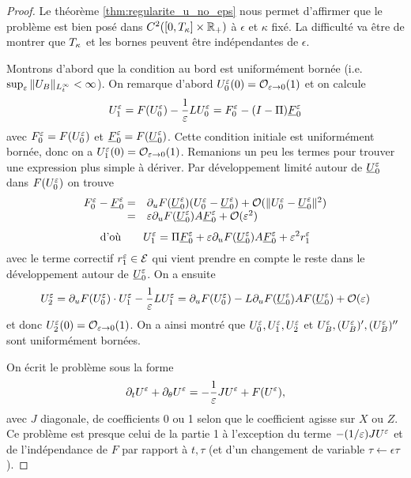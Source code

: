 \begin{proof}
\newcommand{\ulF}{\underline{F}}
Le théorème \ref{thm:regularite_u_no_eps} nous permet d'affirmer que le problème est bien posé dans $C^2([0,T_{\kappa}]\times\mathbb{R}_+)$ à $\epsilon$ et $\kappa$ fixé. La difficulté va être de montrer que $T_{\kappa}$ et les bornes peuvent être indépendantes de $\epsilon$. 

\vspace*{7pt}
Montrons d'abord que la condition au bord est uniformément bornée (i.e. $\sup_{\varepsilon} \|U_B\|_{L^{\infty}_t} < \infty$). 
On remarque d'abord $U_0^{\varepsilon}(0) = \mathcal{O}_{\varepsilon\rightarrow 0}(1)$ et on calcule 
$$U_1\eeps = F(U_0\eeps) - \inveps LU_0\eeps = F_0\eeps - (I-\Pi)\ulF_0\eeps $$
avec $F_0^{\varepsilon} = F(U_0^{\varepsilon})$ et $\ulF_0\eeps = F(\ulU_0\eeps)$. Cette condition initiale est uniformément bornée, donc on a $U_1^{\varepsilon}(0) = \mathcal{O}_{\varepsilon\rightarrow 0}(1)$. Remanions un peu les termes pour trouver une expression plus simple à dériver. Par développement limité autour de $\underline{U}_0^{\varepsilon}$ dans $F(U_0^{\varepsilon})$ on trouve 
$$ \begin{array}{rl}
F_0\eeps - \ulF_0\eeps =& \dpu F(\ulU_0\eeps)(U_0\eeps - \ulU_0\eeps) + \O(\|U_0\eeps - \ulU_0\eeps\|^2) \\
=& \epsilon\dpu F(\ulU_0\eeps) A\ulF_0\eeps + \O(\epsilon^2) 
\end{array} $$ 
$$ \text{d'où} \qquad U_1\eeps = \Pi\ulF_0\eeps + \epsilon\dpu F(\ulU_0\eeps) A\ulF_0\eeps + \epsilon^2 r_1\eeps $$
avec le terme correctif $r_1^{\varepsilon}\in\mathcal{E}$ qui vient prendre en compte le reste dans le développement autour de $\underline{U}_0^{\varepsilon}$. On a ensuite 
$$ U_2^{\varepsilon} = \partial_{u} F(U_0^{\varepsilon})\cdot U_1^{\varepsilon} - \frac{1}{\varepsilon} LU_1^{\varepsilon} = \partial_{u} F(U_0^{\varepsilon}) - L\partial_{u} F(\underline{U}_0^{\varepsilon}) A F(\underline{U}_0^{\varepsilon}) + \mathcal{O}(\varepsilon)$$
et donc $U_2^{\varepsilon}(0) = \mathcal{O}_{\varepsilon\rightarrow 0}(1)$. On a ainsi montré que $U_0^{\varepsilon},U_1^{\varepsilon},U_2^{\varepsilon}$ et $U_B^{\varepsilon},(U_B^{\varepsilon})',(U_B^{\varepsilon})''$ sont uniformément bornées. 

\vspace*{7pt}
On écrit le problème sous la forme 
$$ \partial_t U^{\varepsilon} + \partial_{\theta} U^{\varepsilon} = -\frac{1}{\varepsilon} J U^{\varepsilon} + F(U^{\varepsilon}), $$
avec $J$ diagonale, de coefficients 0 ou 1 selon que le coefficient agisse sur $X$ ou $Z$. 
Ce problème est presque celui de la partie 1 à l'exception du terme $-(1/\varepsilon)JU^{\varepsilon}$ et de l'indépendance de $F$ par rapport à $t,\tau$ (et d'un changement de variable $\tau \leftarrow \epsilon\tau$). 


\end{proof}
